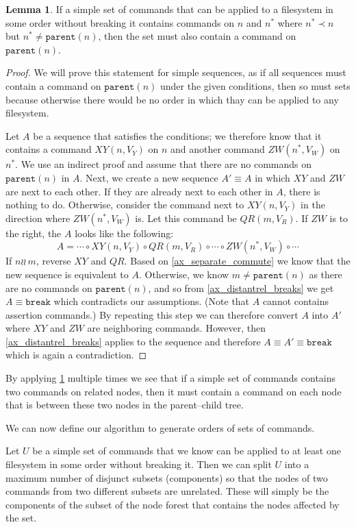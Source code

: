 \documentclass[12pt]{article}
\newcommand{\parent}{\mathtt{parent}}
\newcommand{\nn}{n^*} %
\newcommand{\cbrk}{\mathtt{break}}
\newcommand{\fscommand}[2]{{#1#2}}
\newcommand{\cxy}{\fscommand{X}{Y}}
\newcommand{\czw}{\fscommand{Z}{W}}
\newcommand{\cqr}{\fscommand{Q}{R}}
\newcommand{\cc}{\circ} %
\newcommand{\descendant}{\prec}
\newcommand{\indep}{\wr\!\!\wr\,} %
\newcommand{\unrel}{\indep} %
\theoremstyle{definition}
\newtheorem{mylem}{Lemma}
\begin{document}
\begin{mylem}\label{connected_changes}
If a simple set of commands that can be applied to a filesystem in some order without breaking it
contains commands on $n$ and $\nn$ where $\nn\descendant n$
but $\nn\neq\parent(n)$, then the set must also contain a command on $\parent(n)$.
\end{mylem}
\begin{proof}
We will prove this statement for simple sequences, as if all sequences must contain a command on $\parent(n)$
under the given conditions, then so must sets because otherwise there would be no order in which thay can be
applied to any filesystem.

Let $A$ be a sequence that satisfies the conditions;
we therefore know that it contains a command $\cxy(n,V_Y)$ on $n$
and another command $\czw(\nn,V_W)$ on $\nn$.
We use an indirect proof and assume that there are no commands on $\parent(n)$ in $A$.
Next, we create a new sequence $A'\equiv A$ in which $\cxy$ and $\czw$ are next to each other.
If they are already next to each other in $A$, there is nothing to do.
Otherwise, consider the command next to $\cxy(n,V_Y)$ in the direction where $\czw(\nn,V_W)$ is.
Let this command be $\cqr(m,V_R)$.
If $\czw$ is to the right, the $A$ looks like the following:
\[ A = \cdots\cc\cxy(n,V_Y)\cc\cqr(m,V_R)\cc\cdots\cc\czw(\nn,V_W)\cc\cdots \]
If $n\unrel m$, reverse $\cxy$ and $\cqr$. Based on \cref{ax_separate_commute} we know that the new
sequence is equivalent to $A$.
Otherwise, we know $m\neq\parent(n)$ as there are no commands on $\parent(n)$, and so
from \cref{ax_distantrel_breaks} we get $A\equiv\cbrk$ which contradicts our assumptions.
(Note that $A$ cannot contains assertion commands.)
By repeating this step we can therefore convert $A$ into $A'$ where $\cxy$ and $\czw$ are neighboring commands.
However, then \cref{ax_distantrel_breaks} applies to the sequence and therefore $A\equiv A'\equiv\cbrk$ which
is again a contradiction.
\end{proof}

By applying \cref{connected_changes} multiple times we see that if a simple set of commands
contains two commands on related nodes, then it must contain a command on each
node that is between these two nodes in the parent--child tree.

We can now define our algorithm to generate orders of sets of commands.

Let $U$ be a simple set of commands
that we know can be applied to at least one filesystem in some order without breaking it.
Then we can split $U$ into a maximum number of disjunct subsets
(components) so that the nodes of two commands from two different subsets are unrelated.
These will simply be the components of the subset of the node forest that contains the nodes affected by the set.
\end{document}
